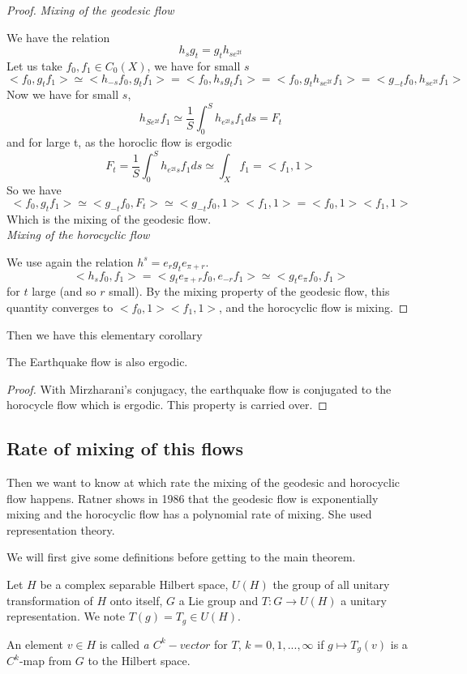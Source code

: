 \begin{proof}
\emph{Mixing of the geodesic flow}

We have the relation \[
h_s g_t =g_t h_{s e^{2t}}
\]
Let us take $f_0,f_1 \in C_0(X)$,
we have for small $s$ %
\[
<f_0,g_t f_1 > \simeq <h_{-s} f_0,g_t f_1 >=<f_0 , h_s g_t f_1 >
= <f_0 , g_t h_{s e^{2t}} f_1 > = <g_{-t} f_0 , h_{s e^{2t}}f_1>
\]
Now we have for small $s$, \[
h_{S e^{2t}}f_1 \simeq \frac{1}{S} \int_0^S h_{e^{2t}s} f_1 ds =F_t
\]
and for large t, as the horoclic flow is ergodic \[
F_t = \frac{1}{S} \int_0^S h_{e^{2t}s} f_1 ds \simeq \int_X f_1 = <f_1 , 1 >
\]
So we have \[
<f_0, g_t f_1 > \simeq <g_{-t} f_0, F_t > \simeq <g_{-t} f_0 ,1 ><f_1,1> = <f_0,1><f_1,1>
\]
Which is the mixing of the geodesic flow.\\


\emph{Mixing of the horocyclic flow}

We use again the relation $h^s = e_r g_t e_{\pi + r}$. \[
<h_s f_0 , f_1 > = < g_t  e_{\pi+r} f_0, e_{-r} f_1> \simeq <g_t e_{\pi} f_0, f_1>
\]
for $t$ large (and so $r$ small). By the mixing property of the geodesic flow, this quantity converges to $<f_0,1><f_1,1>$, and the horocyclic flow is mixing.

\end{proof}


Then we have this elementary corollary

\begin{cor}
The Earthquake flow is also ergodic.
\end{cor}

\begin{proof}
With Mirzharani's conjugacy, the earthquake flow is conjugated to the horocycle flow which is ergodic. This property is carried over.
\end{proof}

\subsection{Rate of mixing of this flows}

Then we want to know at which rate the mixing of the geodesic and horocyclic flow happens. Ratner shows in 1986 \cite{ratner_1987} that the geodesic flow is exponentially mixing and the horocyclic flow has a polynomial rate of mixing. She used representation theory.

We will first give some definitions before getting to the main theorem.

\begin{dfnt}
Let $H$ be a  complex separable Hilbert space, $U(H)$ the group of all unitary transformation of $H$ onto itself, $G$ a Lie group and $T: G \to U(H)$ a unitary representation. We note $T(g)=T_g \in U(H)$.

An element $v \in H$ is called \emph{a $C^k-vector$} for $T$, $k=0,1,...,\infty$ if $g \mapsto T_g(v)$ is a $C^k$-map from $G$ to the Hilbert space.
\end{dfnt}

